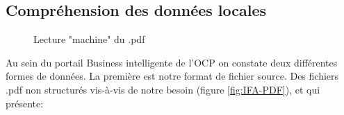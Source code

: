 	\subsection{Compréhension des données locales}
					\begin{figure}
						\raggedleft
						\raggedleft
						\caption{Lecture "machine" du .pdf}
						\label{fig:IFA-TXT}
					\end{figure}
	Au sein du portail Business intelligente de l'OCP on constate deux différentes formes de données.
	La première est notre format de fichier source. Des fichiers .pdf  non structurés vis-à-vis de notre besoin (figure \ref{fig:IFA-PDF}), et qui présente:
